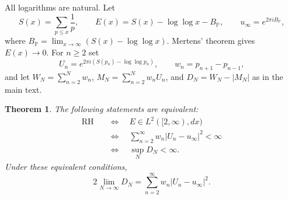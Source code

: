\documentclass[11pt,a4paper]{article}
\newtheorem{theorem}{Theorem}[section]
\theoremstyle{definition}\newtheorem{definition}[theorem]{Definition}
\theoremstyle{remark}\newtheorem{remark}[theorem]{Remark}
\numberwithin{equation}{section}
\begin{document}
All logarithms are natural.  Let
\[
 S(x)=\sum_{p\leq x}\frac1p,
 \qquad E(x)=S(x)-\log\log x-B_{\mathbb P},
 \qquad u_\infty=e^{2\pi iB_{\mathbb P}},
\]
where $B_{\mathbb P}=\lim_{x\to\infty}(S(x)-\log\log x)$.
Mertens' theorem gives $E(x)\to0$.  For $n\geq2$ set
\[
 U_n=e^{2\pi i(S(p_n)-\log\log p_n)},\qquad
 w_n=p_{n+1}-p_{n-1},
\]
and let $W_N=\sum_{n=2}^Nw_n$, $M_N=\sum_{n=2}^Nw_nU_n$,
and $D_N=W_N-|M_N|$ as in the main text.

\begin{theorem}\label{r4a:criterion}
The following statements are equivalent:
\begin{equation}\label{r4a:chain}
 \begin{aligned}
 \mathrm{RH}
 &\quad\Longleftrightarrow\quad E\in L^2([2,\infty),dx)\\
 &\quad\Longleftrightarrow\quad
 \sum_{n=2}^{\infty}w_n|U_n-u_\infty|^2<\infty\\
 &\quad\Longleftrightarrow\quad \sup_ND_N<\infty.
 \end{aligned}
\end{equation}
Under these equivalent conditions,
\begin{equation}\label{r4a:limit}
 2\lim_{N\to\infty}D_N
     =\sum_{n=2}^{\infty}w_n|U_n-u_\infty|^2.
\end{equation}
\end{theorem}
\end{document}
